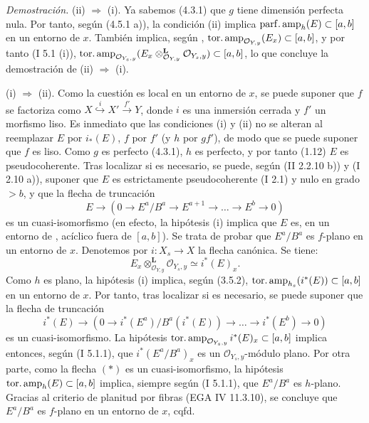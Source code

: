 \emph{Demostración.} (ii) \(\Longrightarrow\) (i). Ya sabemos (4.3.1) que \(g\) tiene dimensión perfecta nula. Por tanto, según (4.5.1 a)), la condición (ii) implica \(\operatorname{parf.amp}_h(E)\subset[a,b]\) en un entorno de \(x\). También implica, según , \(\operatorname{tor.amp}_{\mathcal O_{Y,y}}(E_x)\subset[a,b]\), y por tanto (I 5.1 (i)), \(\operatorname{tor.amp}_{\mathcal O_{Y_s,y}}(E_x\otimes_{\mathcal O_{Y,y}}^{\mathbf L}\mathcal O_{Y_s,y})\subset[a,b]\), lo que concluye la demostración de (ii) \(\Longrightarrow\) (i).

(i) \(\Longrightarrow\) (ii). Como la cuestión es local en un entorno de \(x\), se puede suponer que \(f\) se factoriza como \(X\overset{i}{\hookrightarrow}X'\overset{f'}{\longrightarrow}Y\), donde \(i\) es una inmersión cerrada y \(f'\) un morfismo liso. Es inmediato que las condiciones (i) y (ii) no se alteran al reemplazar \(E\) por \(i_*(E)\), \(f\) por \(f'\) (y \(h\) por \(gf'\)), de modo que se puede suponer que \(f\) es liso. Como \(g\) es perfecto (4.3.1), \(h\) es perfecto, y por tanto (1.12) \(E\) es pseudocoherente. Tras localizar si es necesario, se puede, según (II 2.2.10 b)) y (I 2.10 a)), suponer que \(E\) es estrictamente pseudocoherente (I 2.1) y nulo en grado \(>b\), y que la flecha de truncación
\begin{equation}
 E\longrightarrow(0\longrightarrow E^a/B^a\longrightarrow E^{a+1}\longrightarrow\ldots\longrightarrow E^b\longrightarrow0)\tag*{$t)$}
\end{equation}
es un cuasi-isomorfismo (en efecto, la hipótesis (i) implica que \(E\) es, en un entorno de , acíclico fuera de \([a,b]\)). Se trata de probar que \(E^a/B^a\) es \(f\)-plano en un entorno de \(x\). Denotemos por \(i:X_s\longrightarrow X\) la flecha canónica. Se tiene:
\begin{equation}
 E_x\otimes_{\mathcal O_{Y,y}}^{\mathbf L}\mathcal O_{Y_s,y}\simeq i^*(E)_x.\tag{$*$}
\end{equation}
Como \(h\) es plano, la hipótesis (i) implica, según (3.5.2), \(\operatorname{tor.amp}_{h_s}(i^*(E))\subset[a,b]\) en un entorno de \(x\). Por tanto, tras localizar si es necesario, se puede suponer que la flecha de truncación
\begin{equation}
 i^*(E)\longrightarrow(0\longrightarrow i^*(E^a)/B^a(i^*(E))\longrightarrow\ldots\longrightarrow i^*(E^b)\longrightarrow0)\tag*{$i^*(t)$}
\end{equation}
es un cuasi-isomorfismo. La hipótesis \(\operatorname{tor.amp}_{\mathcal O_{Y_s,y}}i^*(E)_x\subset[a,b]\) implica entonces, según (I 5.1.1), que \(i^*(E^a/B^a)_x\) es un \(\mathcal O_{Y_s,y}\)-módulo plano. Por otra parte, como la flecha \((*)\) es un cuasi-isomorfismo, la hipótesis \(\operatorname{tor.amp}_h(E)\subset[a,b]\) implica, siempre según (I 5.1.1), que \(E^a/B^a\) es \(h\)-plano. Gracias al criterio de planitud por fibras (EGA IV 11.3.10), se concluye que \(E^a/B^a\) es \(f\)-plano en un entorno de \(x\), cqfd.
